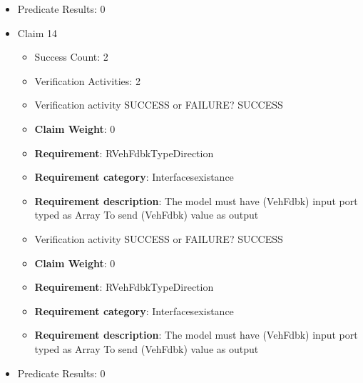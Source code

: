 \documentclass{article}
\begin{document}
\begin{itemize}
\begin{itemize}
					\item Verification activity SUCCESS or FAILURE? SUCCESS
					\item \textbf{Claim Weight}: 0
						\item \textbf{Requirement}: RPoseTypeDirection 
						\item \textbf{Requirement category}: Interfacesexistance 
						\item \textbf{Requirement description}: The model must have (Pose) input port typed as BusVehiclePose To get (Pose) value as input
					
				\end{itemize}
				
									    
				\item Predicate Results: 0

  				  \item Claim 14
				\begin{itemize}
			    	\item Success Count: 2 
			    	\item Verification Activities: 2
					\item Verification activity SUCCESS or FAILURE? SUCCESS
					\item \textbf{Claim Weight}: 0
						\item \textbf{Requirement}: RVehFdbkTypeDirection 
						\item \textbf{Requirement category}: Interfacesexistance 
						\item \textbf{Requirement description}: The model must have (VehFdbk) input port typed as Array To send (VehFdbk) value as output
					
					\item Verification activity SUCCESS or FAILURE? SUCCESS
					\item \textbf{Claim Weight}: 0
						\item \textbf{Requirement}: RVehFdbkTypeDirection 
						\item \textbf{Requirement category}: Interfacesexistance 
						\item \textbf{Requirement description}: The model must have (VehFdbk) input port typed as Array To send (VehFdbk) value as output
					
				\end{itemize}
				
									    
				\item Predicate Results: 0


\end{itemize}
\end{document}
